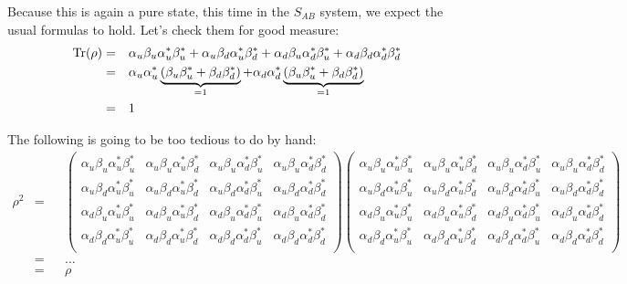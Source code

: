 \documentclass[solutions.tex]{subfiles}
\begin{document}
Because this is again a pure state, this time in the $S_{AB}$ system,
we expect the usual formulas to hold. Let's check them for good measure:
\begin{equation*}\begin{aligned}
	\text{Tr}(\rho) &=&& \alpha_u\beta_u\alpha_u^*\beta_u^*
		+ \alpha_u\beta_d\alpha_u^*\beta_d^*
		+ \alpha_d\beta_u\alpha_d^*\beta_u^*
		+ \alpha_d\beta_d\alpha_d^*\beta_d^* \\
	~ &=&& \alpha_u\alpha_u^*\underbrace{(
		\beta_u\beta_u^* + \beta_d\beta_d^*
	)}_{=1} + \alpha_d\alpha_d^*\underbrace{(
		\beta_u\beta_u^*+ \beta_d\beta_d^*
	)}_{=1} \\
	~ &=&& 1 \\
\end{aligned}\end{equation*}

The following is going to be too tedious to do by hand:
\begin{equation*}\begin{aligned}
	\rho^2 &=&& \begin{pmatrix}
		\alpha_u\beta_u\alpha_u^*\beta_u^*
			& \alpha_u\beta_u\alpha_u^*\beta_d^*
			& \alpha_u\beta_u\alpha_d^*\beta_u^*
			& \alpha_u\beta_u\alpha_d^*\beta_d^* \\
		\alpha_u\beta_d\alpha_u^*\beta_u^*
			& \alpha_u\beta_d\alpha_u^*\beta_d^*
			& \alpha_u\beta_d\alpha_d^*\beta_u^*
			& \alpha_u\beta_d\alpha_d^*\beta_d^* \\
		\alpha_d\beta_u\alpha_u^*\beta_u^*
			& \alpha_d\beta_u\alpha_u^*\beta_d^*
			& \alpha_d\beta_u\alpha_d^*\beta_u^*
			& \alpha_d\beta_u\alpha_d^*\beta_d^* \\
		\alpha_d\beta_d\alpha_u^*\beta_u^*
			& \alpha_d\beta_d\alpha_u^*\beta_d^*
			& \alpha_d\beta_d\alpha_d^*\beta_u^*
			& \alpha_d\beta_d\alpha_d^*\beta_d^* \\
	\end{pmatrix}\begin{pmatrix}
		\alpha_u\beta_u\alpha_u^*\beta_u^*
			& \alpha_u\beta_u\alpha_u^*\beta_d^*
			& \alpha_u\beta_u\alpha_d^*\beta_u^*
			& \alpha_u\beta_u\alpha_d^*\beta_d^* \\
		\alpha_u\beta_d\alpha_u^*\beta_u^*
			& \alpha_u\beta_d\alpha_u^*\beta_d^*
			& \alpha_u\beta_d\alpha_d^*\beta_u^*
			& \alpha_u\beta_d\alpha_d^*\beta_d^* \\
		\alpha_d\beta_u\alpha_u^*\beta_u^*
			& \alpha_d\beta_u\alpha_u^*\beta_d^*
			& \alpha_d\beta_u\alpha_d^*\beta_u^*
			& \alpha_d\beta_u\alpha_d^*\beta_d^* \\
		\alpha_d\beta_d\alpha_u^*\beta_u^*
			& \alpha_d\beta_d\alpha_u^*\beta_d^*
			& \alpha_d\beta_d\alpha_d^*\beta_u^*
			& \alpha_d\beta_d\alpha_d^*\beta_d^* \\
	\end{pmatrix} \\
	~ &=&& \ldots \\
	~ &=&& \rho \\
\end{aligned}\end{equation*}
\end{document}
